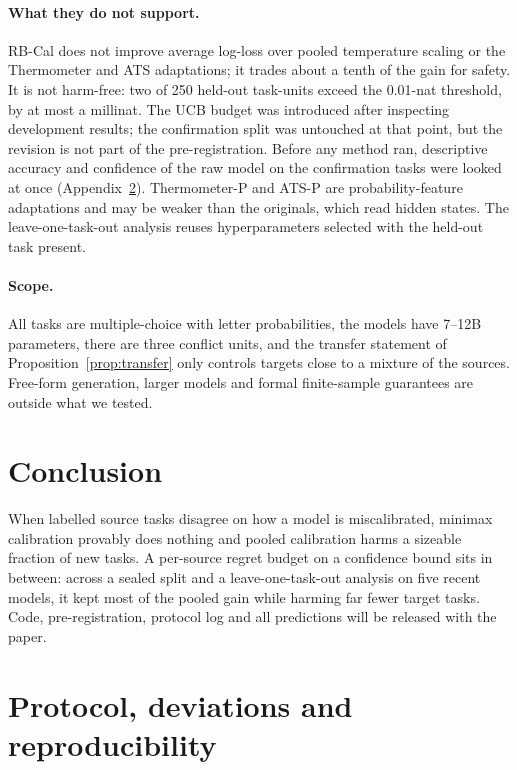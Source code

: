 \documentclass[11pt]{article}
\theoremstyle{remark}
\begin{document}
\paragraph{What they do not support.}
RB-Cal does not improve average log-loss over pooled temperature scaling or the Thermometer and ATS adaptations; it trades about a tenth of the gain for safety.
It is not harm-free: two of 250 held-out task-units exceed the 0.01-nat threshold, by at most a millinat.
The UCB budget was introduced after inspecting development results; the confirmation split was untouched at that point, but the revision is not part of the pre-registration.
Before any method ran, descriptive accuracy and confidence of the raw model on the confirmation tasks were looked at once (Appendix~\ref{app:protocol}).
Thermometer-P and ATS-P are probability-feature adaptations and may be weaker than the originals, which read hidden states.
The leave-one-task-out analysis reuses hyperparameters selected with the held-out task present.

\paragraph{Scope.}
All tasks are multiple-choice with letter probabilities, the models have 7--12B parameters, there are three conflict units, and the transfer statement of Proposition~\ref{prop:transfer} only controls targets close to a mixture of the sources.
Free-form generation, larger models and formal finite-sample guarantees are outside what we tested.

\section{Conclusion}
When labelled source tasks disagree on how a model is miscalibrated, minimax calibration provably does nothing and pooled calibration harms a sizeable fraction of new tasks.
A per-source regret budget on a confidence bound sits in between: across a sealed split and a leave-one-task-out analysis on five recent models, it kept most of the pooled gain while harming far fewer target tasks.
Code, pre-registration, protocol log and all predictions will be released with the paper.




\appendix
\section{Protocol, deviations and reproducibility}\label{app:protocol}
\end{document}
